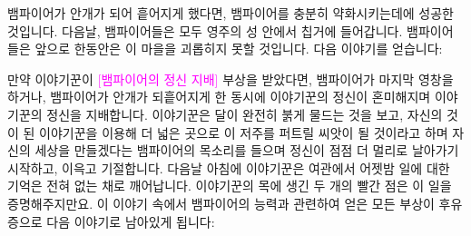 \documentclass{report}
\begin{document}
	\medskip
	
	뱀파이어가 안개가 되어 흩어지게 했다면, 뱀파이어를 충분히 약화시키는데에 성공한 것입니다. 다음날, 뱀파이어들은 모두 영주의 성 안에서 칩거에 들어갑니다. 뱀파이어들은 앞으로 한동안은 이 마을을 괴롭히지 못할 것입니다. 다음 이야기를 얻습니다:
	
	
	만약 이야기꾼이 \textcolor{Magenta}{[뱀파이어의 정신 지배]} 부상을 받았다면, 뱀파이어가 마지막 영창을 하거나, 뱀파이어가 안개가 되흩어지게 한 동시에 이야기꾼의 정신이 혼미해지며 이야기꾼의 정신을 지배합니다. 이야기꾼은 달이 완전히 붉게 물드는 것을 보고, 자신의 것이 된 이야기꾼을 이용해 더 넓은 곳으로 이 저주를 퍼트릴 씨앗이 될 것이라고 하며 자신의 세상을 만들겠다는 뱀파이어의 목소리를 들으며 정신이 점점 더 멀리로 날아가기 시작하고, 이윽고 기절합니다. 다음날 아침에 이야기꾼은 여관에서 어젯밤 일에 대한 기억은 전혀 없는 채로 깨어납니다. 이야기꾼의 목에 생긴 두 개의 빨간 점은 이 일을 증명해주지만요. 이 이야기 속에서 뱀파이어의 능력과 관련하여 얻은 모든 부상이 후유증으로 다음 이야기로 남아있게 됩니다:
	
	\hypertarget{vamp-master}{}
	
	
	
\end{document}

